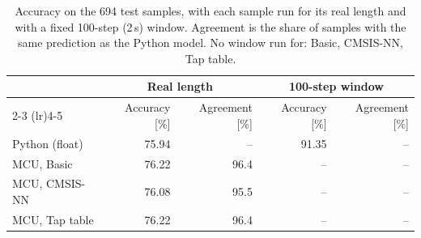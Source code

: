 \begin{table}[htbp]
\centering
\caption{Accuracy on the 694 test samples, with each sample run for its real length and with a fixed
100-step (2\,s) window. Agreement is the share of samples with the same prediction as the Python model. No window run for: Basic, CMSIS-NN, Tap table.}
\label{tab:accuracy}
\begin{tabular}{lrrrr}
\toprule
 & \multicolumn{2}{c}{Real length} & \multicolumn{2}{c}{100-step window} \\
\cmidrule(lr){2-3} \cmidrule(lr){4-5}
 & Accuracy [\%] & Agreement [\%] & Accuracy [\%] & Agreement [\%] \\
\midrule
Python (float) & 75.94 & -- & 91.35 & -- \\
MCU, Basic & 76.22 & 96.4 & -- & -- \\
MCU, CMSIS-NN & 76.08 & 95.5 & -- & -- \\
MCU, Tap table & 76.22 & 96.4 & -- & -- \\
\bottomrule
\end{tabular}
\end{table}
